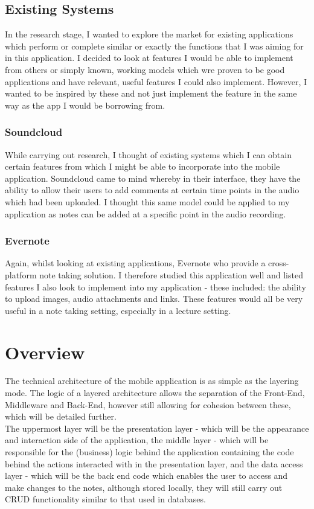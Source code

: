 \documentclass[oneside]{report}
\begin{document}
		\subsection{Existing Systems}
In the research stage, I wanted to explore the market for existing applications which perform or complete similar or exactly the functions that I was aiming for in this application. I decided to look at features I would be able to implement from others or simply known, working models which wre proven to be good applications and have relevant, useful features I could also implement. However, I wanted to be inspired by these and not just implement the feature in the same way as the app I would be borrowing from.
			\subsubsection{Soundcloud}
While carrying out research, I thought of existing systems which I can obtain certain features from which I might be able to incorporate into the mobile application. Soundcloud came to mind whereby in their interface, they have the ability to allow their users to add comments at certain time points in the audio which had been uploaded. I thought this same model could be applied to my application as notes can be added at a specific point in the audio recording.
			\subsubsection{Evernote}
Again, whilst looking at existing applications, Evernote who provide a cross-platform note taking solution. I therefore studied this application well and listed features I also look to implement into my application - these included: the ability to upload images, audio attachments and links. These features would all be very useful in a note taking setting, especially in a lecture setting.

	\section{Overview}
The technical architecture of the mobile application is as simple as the layering mode. The logic of a layered architecture allows the separation of the Front-End, Middleware and Back-End, however still allowing for cohesion between these, which will be detailed further.\\

The uppermost layer will be the presentation layer - which will be the appearance and interaction side of the application, the middle layer - which will be responsible for the (business) logic behind the application containing the code behind the actions interacted with in the presentation layer, and the data access layer - which will be the back end code which enables the user to access and make changes to the notes, although stored locally, they will still carry out CRUD functionality similar to that used in databases.
\end{document}
